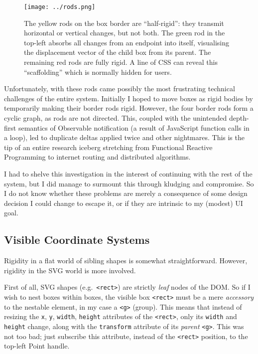 \begin{figure}[h]
  \centering
  \texttt{[image: ../rods.png]}
  \caption{The yellow rods on the box border are ``half-rigid'': they transmit horizontal or vertical changes, but not both. The green rod in the top-left absorbs all changes from an endpoint into itself, visualising the displacement vector of the child box from its parent. The remaining red rods are fully rigid. A line of CSS can reveal this ``scaffolding'' which is normally hidden for users. \label{fig:rods}}
\end{figure}

Unfortunately, with these rods came possibly the most frustrating
technical challenges of the entire system. Initially I hoped to move
boxes as rigid bodies by temporarily making their border rods rigid.
However, the four border rods form a cyclic graph, as rods are not
directed. This, coupled with the unintended depth-first semantics of
Observable notification (a result of JavaScript function calls in a
loop), led to duplicate deltas applied twice and other nightmares. This
is the tip of an entire research iceberg stretching from Functional
Reactive Programming to internet routing and distributed algorithms.

I had to shelve this investigation in the interest of continuing with
the rest of the system, but I did manage to surmount this through
kludging and compromise. So I do not know whether these problems are
merely a consequence of some design decision I could change to escape
it, or if they are intrinsic to my (modest) UI goal.

\hypertarget{visible-coordinate-systems}{%
\subsection{Visible Coordinate
Systems}\label{visible-coordinate-systems}}

Rigidity in a flat world of sibling shapes is somewhat straightforward.
However, rigidity in the SVG world is more involved.

First of all, SVG shapes (e.g.~\texttt{\textless{}rect\textgreater{}})
are strictly \emph{leaf} nodes of the DOM. So if I wish to nest boxes
within boxes, the visible box \texttt{\textless{}rect\textgreater{}}
must be a mere \emph{accessory} to the nestable element, in my case a
\texttt{\textless{}g\textgreater{}} (group). This means that instead of
resizing the \texttt{x}, \texttt{y}, \texttt{width}, \texttt{height}
attributes of the \texttt{\textless{}rect\textgreater{}}, only its
\texttt{width} and \texttt{height} change, along with the
\texttt{transform} attribute of its \emph{parent}
\texttt{\textless{}g\textgreater{}}. This was not too bad; just
subscribe this attribute, instead of the
\texttt{\textless{}rect\textgreater{}} position, to the top-left Point
handle.

